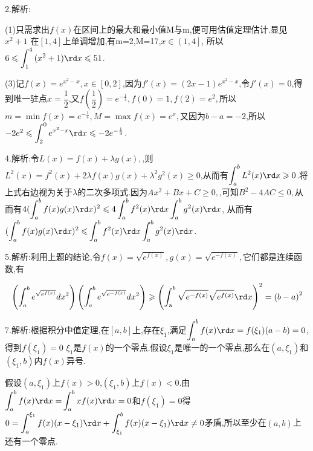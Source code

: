 2.解析:

(1)只需求出$f(x)$在区间上的最大和最小值M与m,便可用估值定理估计.显见${x^2} + 1$
在$[1,4]$上单调增加,有m=2,M=17,$x \in \left( {1,4} \right]$,
所以$6 \leqslant \displaystyle\int_1^4 {({x^2} + 1)\rd x}   \leqslant 51 $.

(3)记$f\left( x \right) = {e^{{x^2} - x}},x \in \left[ {0,2} \right]$,因为$f'\left( x \right) = \left( {2x - 1} \right){e^{{x^2} - x}}$,令$f'\left( x \right) = 0$,得到唯一驻点$x = \dfrac{1}{2}$,又$f\left( {\dfrac{1}{2}} \right) = {e^{ - \frac{1}{4}}},f\left( 0 \right) = 1,f\left( 2\right) = {e^2},$所以$m = \min f\left( x \right) = {e^{ - \frac{1}{4}}},M = \max f\left( x \right) = {e^x},$又因为$b - a = -2$,所以$ - 2{e^2} \leqslant {\displaystyle\int_2^0 e ^{{x^2} - x}}\rd x \leqslant  - 2{e^{ - \frac{1}{4}}}$.

4.解析:令$L\left( x \right) = f\left( x \right) + \lambda g\left( x \right),$,则${L^2}\left( x \right) = {f^2}\left( x \right) + 2\lambda f\left( x \right)g\left( x \right) + {\lambda ^2}{g^2}\left( x \right) \geqslant 0$,从而有$\displaystyle\int_a^b {{L^2}(x)} \rd x \geqslant 0$.将上式右边视为关于$\lambda $的二次多项式.因为$A{x^2} + Bx + C \geqslant 0,$,可知${B^2} - 4AC \leqslant 0,$从而有$4(\displaystyle\int_a^b {f(x)g(x)\rd x{)^2} \leqslant 4} \displaystyle\int_a^b {{f^2}(x)\rd x} \displaystyle\int_a^b {{g^2}(x)\rd x} $,
从而有$(\displaystyle\int_a^b {f(x)g(x)\rd x{)^2} \leqslant } \displaystyle\int_a^b {{f^2}(x)\rd x} \displaystyle\int_a^b {{g^2}(x)\rd x} $.

5.解析:利用上题的结论,令$f\left( x \right) = \sqrt {{e^{f\left( x \right)}}} ,g\left( x \right) = \sqrt {{e^{ - f\left( x \right)}}} ,$它们都是连续函数,有

\[\left( {\displaystyle\int_a^b {{e^{\sqrt {{e^{f(x)}}} }}} d{x^2}} \right)\left( {\displaystyle\int_a^b {{e^{\sqrt {{e^{ - f(x)}}} }}} d{x^2}} \right) \geqslant {\left( {\displaystyle\int_{\text{a}}^b {\sqrt {{e^{ - f(x)}}} } \sqrt {{e^{f(x)}}} \rd x} \right)^2} = {\left( {b - a} \right)^2}\]

7.解析:根据积分中值定理,在$[a,b]$上,存在${\xi _1}$,满足$\displaystyle\int_a^b {f(x)\rd x}  = f({\xi _1})(a - b) = 0$,得到$f({\xi _1}) = 0$
${\xi _1}$是$f(x)$的一个零点.假设${\xi _1}$是唯一的一个零点,那么在$(a,{\xi _1})$和$({\xi _1},b)$内$f(x)$异号.

假设$(a,{\xi _1})$上$f(x) > 0$,$({\xi _1},b)$上$f(x) < 0$.由$\displaystyle\int_a^b {f(x)\rd x = } \displaystyle\int_a^b {xf(x)\rd x}  = 0$和$f({\xi _1}) = 0$得$0 = \displaystyle\int_a^{{\xi _1}} {f(x)(x - {\xi _1})\rd x}  + \displaystyle\int_{{\xi _1}}^b {f(x)(x - {\xi _1})\rd x \ne 0} $矛盾,所以至少在$(a,b)$上还有一个零点.


